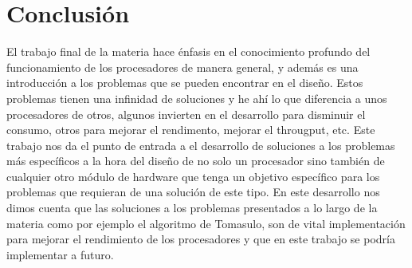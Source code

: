 \newpage
\section{Conclusi\'on}
El trabajo final de la materia hace \'enfasis en el conocimiento profundo del funcionamiento de los procesadores de manera general, y adem\'as es una introducci\'on a los problemas que se pueden encontrar en el diseño. 
Estos problemas tienen una infinidad de soluciones y he ah\'i lo que diferencia a unos procesadores de otros, algunos invierten en el desarrollo para disminuir el consumo, otros para mejorar el rendimento, mejorar el througput, etc. 
Este trabajo nos da el punto de entrada a el desarrollo de soluciones a los problemas m\'as espec\'ificos a la hora del diseño de no solo un procesador sino tambi\'en de cualquier otro m\'odulo de hardware que tenga un objetivo espec\'ifico para los problemas que requieran de una soluci\'on de este tipo. En este desarrollo nos dimos cuenta que las soluciones a los problemas presentados a lo largo de la materia como por ejemplo el algoritmo de Tomasulo, son de vital implementaci\'on para mejorar el rendimiento de los procesadores y que en este trabajo se podr\'ia implementar a futuro.  